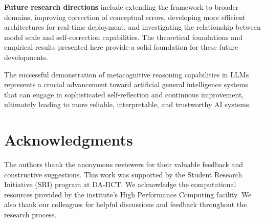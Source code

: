 \documentclass[10pt,twocolumn]{article}
\begin{document}
\textbf{Future research directions} include extending the framework to broader domains, improving correction of conceptual errors, developing more efficient architectures for real-time deployment, and investigating the relationship between model scale and self-correction capabilities. The theoretical foundations and empirical results presented here provide a solid foundation for these future developments.

The successful demonstration of metacognitive reasoning capabilities in LLMs represents a crucial advancement toward artificial general intelligence systems that can engage in sophisticated self-reflection and continuous improvement, ultimately leading to more reliable, interpretable, and trustworthy AI systems.

\section*{Acknowledgments}

The authors thank the anonymous reviewers for their valuable feedback and constructive suggestions. This work was supported by the Student Research Initiative (SRI) program at DA-IICT. We acknowledge the computational resources provided by the institute's High Performance Computing facility. We also thank our colleagues for helpful discussions and feedback throughout the research process.
\end{document}
